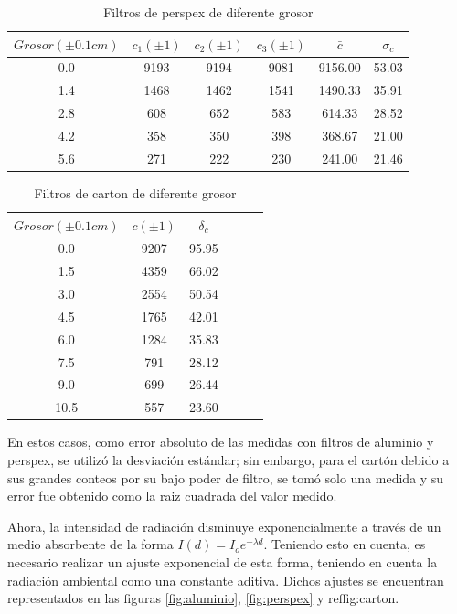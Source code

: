 \documentclass[%
 reprint,
 amsmath,amssymb,
 aps,
]{revtex4-1}
\begin{document}
\begin{table}[h!]
\centering
 \begin{tabular}{|c|c|c|c|c|c|} 
 \hline
 $Grosor(\pm0.1cm)$ & $c_1(\pm1)$ & $c_2(\pm1)$ & $c_3(\pm1)$ & $\bar{c}$ & $\sigma_c$ \\ [0.5ex] 
 \hline\hline
 0.0&9193&9194&9081&9156.00&53.03\\
 1.4&1468&1462&1541&1490.33&35.91\\
 2.8&608&652&583&614.33&28.52\\
 4.2&358&350&398&368.67&21.00\\
 5.6&271&222&230&241.00&21.46\\
[1ex] 
 \hline
 \end{tabular}
 \caption{Filtros de perspex de diferente grosor}
 \label{table:perspex}
\end{table}

\begin{table}[h!]
\centering
 \begin{tabular}{|c|c|c|c|c|c|} 
 \hline
 $Grosor(\pm0.1cm)$ & $c(\pm1)$ & $\delta_c$ \\ [0.5ex] 
 \hline\hline
 0.0&9207&95.95\\
 1.5&4359&66.02\\
 3.0&2554&50.54\\
 4.5&1765&42.01\\
 6.0&1284&35.83\\
 7.5&791&28.12\\
 9.0&699&26.44\\
 10.5&557&23.60\\
[1ex] 
 \hline
 \end{tabular}
 \caption{Filtros de carton de diferente grosor}
 \label{table:carton}
\end{table}

En estos casos, como error absoluto de las medidas con filtros de aluminio y perspex, se utilizó la desviación estándar; sin embargo, para el cartón debido a sus grandes conteos por su bajo poder de filtro, se tomó solo una medida y su error fue obtenido como la raiz cuadrada del valor medido. 

Ahora, la intensidad de radiación disminuye exponencialmente a través de un medio absorbente de la forma $I(d) = I_oe^{-\lambda d}$. Teniendo esto en cuenta, es necesario realizar un ajuste exponencial de esta forma, teniendo en cuenta la radiación ambiental como una constante aditiva. Dichos ajustes se encuentran representados en las figuras \ref{fig:aluminio}, \ref{fig:perspex} y ref{fig:carton}.\\
\end{document}
